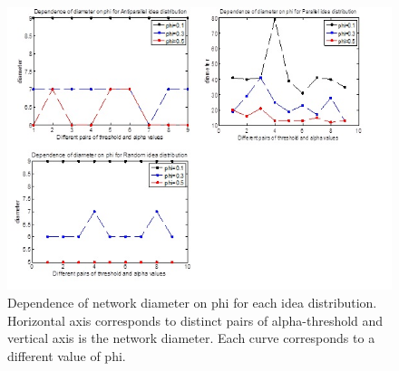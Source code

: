 \documentclass{beamer}
\begin{document}
\begin{frame}
\begin{figure}
[htp]
\begin{center}
\includegraphics{Fig15}
\end{center}
\caption {Dependence of network diameter on phi for each idea distribution. Horizontal axis corresponds to distinct pairs of alpha-threshold and vertical axis is the network diameter. Each curve corresponds to a different value of phi. }
\label {fig15}
\end{figure}

\end{frame}
%
\end{document}
